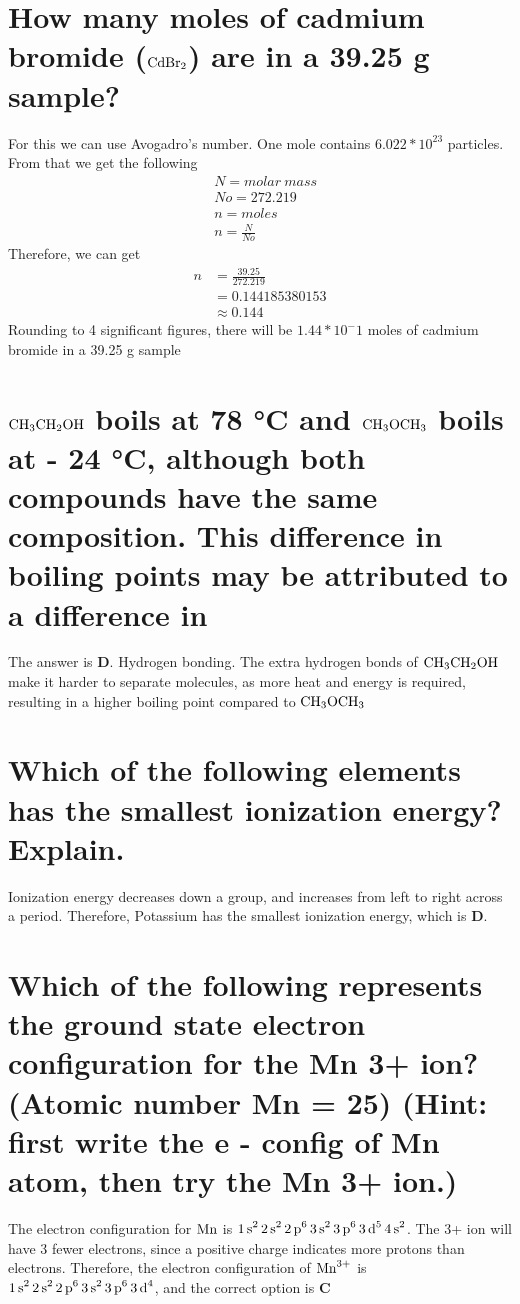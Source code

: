 \documentclass[11pt]{article}
\begin{document}
\section{How many moles of cadmium bromide (\(\ce{CdBr2}\)) are in a 39.25 g sample?}
\label{sec:org6cad2af}
For this we can use Avogadro's number. One mole contains \(6.022*10^{23}\) particles. From that we get the following
\begin{align*}
&N = molar\ mass\\
&No = 272.219\\
&n = moles\\
&n=\frac{N}{No}
\end{align*}
Therefore, we can get
\begin{align*}
n&= \frac{39.25}{272.219}\\
&=0.144185380153\\
&\approx0.144
\end{align*}
Rounding to 4 significant figures, there will be \(1.44*10^-1\) moles of cadmium bromide in a 39.25 g sample

\section{\(\ce{CH3CH2OH}\) boils at 78 °C and \(\ce{CH3OCH3}\) boils at - 24 °C, although both compounds have the same composition. This difference in boiling points may be attributed to a difference in}
\label{sec:orgab8fd02}
The answer is \textbf{D}. Hydrogen bonding. The extra hydrogen bonds of \(\ce{CH3CH2OH}\) make it harder to separate molecules, as more heat and energy is required, resulting in a higher boiling point compared to \(\ce{CH3OCH3}\)

\section{Which of the following elements has the smallest ionization energy? Explain.}
\label{sec:org49f0bee}
Ionization energy decreases down a group, and increases from left to right
across a period. Therefore, Potassium has the smallest ionization energy, which is \textbf{D}.

\section{Which of the following represents the ground state electron configuration for the Mn 3+ ion? (Atomic number Mn = 25) (Hint: first write the e - config of Mn atom, then try the Mn 3+ ion.)}
\label{sec:org04b1270}
The electron configuration for \(\ce{Mn}\) is \(\ce{1s^2 2s^2 2p^6 3s^2 3p^6 3d^5 4s^2}\). The 3+ ion will have 3 fewer electrons, since a positive charge indicates more protons than electrons. Therefore, the electron configuration of \(\ce{Mn^{3+}}\) is \(\ce{1s^2 2s^2 2p^6 3s^2 3p^6 3d^4}\), and the correct option is \textbf{C}
\end{document}
